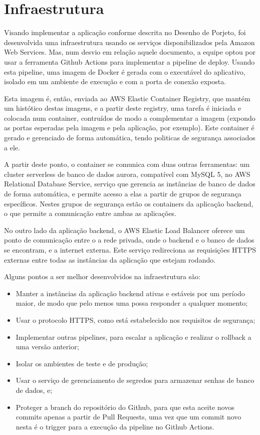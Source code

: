 \chapter{Infraestrutura}

Visando implementar a aplicação conforme descrita no Desenho de
Porjeto, foi desenvolvida uma infraestrutura usando os serviços
disponibilizados pela Amazon Web Services.  Mas, num desvio em relação
aquele documento, a equipe optou por usar a ferramenta Github Actions
para implementar a pipeline de deploy.  Usando esta pipeline, uma
imagem de Docker é gerada com o executável do aplicativo, isolado em
um ambiente de execução e com a porta de conexão exposta.

Esta imagem é, então, enviada ao AWS Elastic Container Registry, que
mantém um histótico destas imagens, e a partir deste registry, uma
tarefa é iniciada e colocada num container, contruídos de modo a
complementar a imagem (expondo as portas esperadas pela imagem e pela
aplicação, por exemplo). Este container é gerado e gerenciado de forma
automática, tendo politicas de segurança associados a ele.

A partir deste ponto, o container se comunica com duas outras
ferramentas: um cluster serverless de banco de dados aurora,
compatível com MySQL 5, no AWS Relational Database Service, serviço
que gerencia as instâncias de banco de dados de forma automática, e
permite acesso a elas a partir de grupos de segurança
específicos. Nestes grupos de segurança estão os containers da
aplicação backend, o que permite a comunicação entre ambas as
aplicações.

No outro lado da aplicação backend, o AWS Elastic Load Balancer
oferece um ponto de comunicação entre o a rede privada, onde o backend
e o banco de dados se encontram, e a internet externa. Este serviço
redireciona as requisições HTTPS externas entre todas as instâncias da
aplicação que estejam rodando.

Alguns pontos a ser melhor desenvolvidos na infraestrutura são:
\begin{itemize}
\item Manter a instâncias da aplicação backend ativas e estáveis por
  um período maior, de modo que pelo menos uma possa responder a
  qualquer momento;
\item Usar o protocolo HTTPS, como está estabelecido nos requisitos de
  segurança;
\item Implementar outras pipelines, para escalar a aplicação e
  realizar o rollback a uma versão anterior;
\item Isolar os ambientes de teste e de produção;
\item Usar o serviço de gerenciamento de segredos para armazenar
  senhas de banco de dados, e;
\item Proteger a branch  do repositório do Github, para
  que esta aceite novos commits apenas a partir de Pull Requests, uma
  vez que um commit novo nesta é o trigger para a execução da pipeline
  no Github Actions.
\end{itemize}
